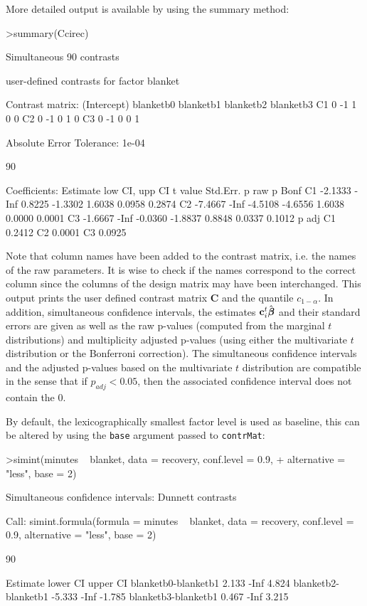 \documentclass{article}
\newcommand{\bbeta}{\mbox{\boldmath $\beta$}}
\newcommand{\bc}{{\mathbf{c}}}
\newcommand{\bC}{{\mathbf{C}}}
\begin{document}
More detailed output is available by using the summary method:
\small
\begin{Schunk}
\begin{Sinput}
>summary(Ccirec)
\end{Sinput}
\begin{Soutput}
	Simultaneous 90% confidence intervals: user-defined
	contrasts

	 user-defined contrasts for factor blanket

Contrast matrix:
   (Intercept) blanketb0 blanketb1 blanketb2 blanketb3
C1           0        -1         1         0         0
C2           0        -1         0         1         0
C3           0        -1         0         0         1

Absolute Error Tolerance:  1e-04 

 90 % quantile:  1.843 

Coefficients:
   Estimate low CI,  upp CI t value Std.Err.  p raw p Bonf
C1  -2.1333    -Inf  0.8225 -1.3302   1.6038 0.0958 0.2874
C2  -7.4667    -Inf -4.5108 -4.6556   1.6038 0.0000 0.0001
C3  -1.6667    -Inf -0.0360 -1.8837   0.8848 0.0337 0.1012
    p adj
C1 0.2412
C2 0.0001
C3 0.0925
\end{Soutput}
\end{Schunk}
Note that column names have been added to the contrast matrix, i.e. the
names of the raw parameters. It is wise to check if the names correspond to
the correct column since the columns of the design matrix may have been
interchanged. 
\normalsize
This output prints the user defined contrast matrix $\bC$ 
and the quantile $c_{1-\alpha}$. In addition,
simultaneous confidence intervals, the estimates $\bc_i^t
\hat{\bbeta}$ and their standard errors are given as well as the raw
p-values (computed from the marginal $t$ distributions) and
multiplicity adjusted p-values (using either the multivariate $t$ distribution or
the Bonferroni correction). The simultaneous confidence intervals
and the adjusted p-values based on the multivariate $t$ distribution are compatible in
the sense that if $p_{adj}<0.05$, then the associated confidence
interval does not contain the 0.

By default, the lexicographically smallest factor level is used as baseline,
this can be altered by using the \texttt{base} argument passed to
\texttt{contrMat}:
\small
\begin{Schunk}
\begin{Sinput}
>simint(minutes ~ blanket, data = recovery, conf.level = 0.9, 
+     alternative = "less", base = 2)
\end{Sinput}
\begin{Soutput}
	Simultaneous confidence intervals: Dunnett
	contrasts

Call: 
simint.formula(formula = minutes ~ blanket, data = recovery, 
    conf.level = 0.9, alternative = "less", base = 2)

	90 % confidence intervals

                    Estimate lower CI upper CI
blanketb0-blanketb1    2.133     -Inf    4.824
blanketb2-blanketb1   -5.333     -Inf   -1.785
blanketb3-blanketb1    0.467     -Inf    3.215
\end{Soutput}
\end{Schunk}
\normalsize
\end{document}
